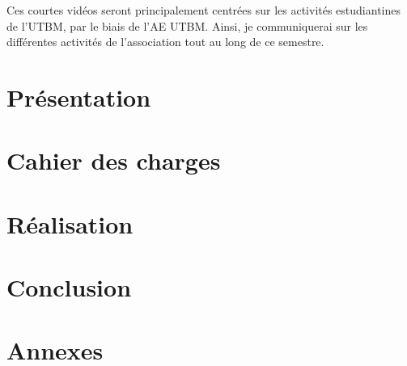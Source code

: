 \documentclass{librairies/lib}
\begin{document}
Ces courtes vidéos seront principalement centrées sur les activités estudiantines de l'\gls{UTBM}, par le biais de l'\gls{AE} \gls{UTBM}.
Ainsi, je communiquerai sur les différentes activités de l'association tout au long de ce semestre.

\newpage



\tableofcontents
\newpage



\pagestyle{number}

\section{Présentation}\label{sec:presentation}



\newpage

\section{Cahier des charges}\label{sec:cahier-des-charges}



\newpage

\section{Réalisation}\label{sec:realisation}



\newpage


\section{Conclusion}\label{sec:conclusion}





\newpage
{}

\printglossaries


\newpage




\section*{Annexes}





\newpage

\listoffigures
{}


\newpage

\listoftables
{}

\newpage



\end{document}
